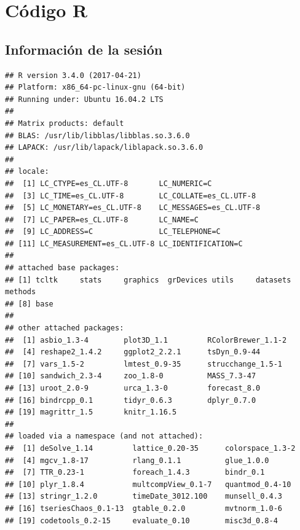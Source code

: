 \documentclass[12pt, twoside]{book}\usepackage[]{graphicx}\usepackage[]{color}
\makeatletter
\newenvironment{kframe}{%
 \def\at@end@of@kframe{}%
 \ifinner\ifhmode%
  \def\at@end@of@kframe{\end{minipage}}%
  \begin{minipage}{\columnwidth}%
 \fi\fi%
 \def\FrameCommand##1{\hskip\@totalleftmargin \hskip-\fboxsep
 \colorbox{shadecolor}{##1}\hskip-\fboxsep
     \hskip-\linewidth \hskip-\@totalleftmargin \hskip\columnwidth}%
 \MakeFramed {\advance\hsize-\width
   \@totalleftmargin\z@ \linewidth\hsize
   \@setminipage}}%
 {\par\unskip\endMakeFramed%
 \at@end@of@kframe}
\newenvironment{knitrout}{}{} %
\numberwithin{equation}{section}
\numberwithin{theorem}{section}
\numberwithin{teorema}{section}
\numberwithin{defi}{section}
\numberwithin{prop}{section}
\numberwithin{defi}{section}
\theoremstyle{plain}
\makeatother
\begin{document}
\endgroup
\begingroup
\renewcommand\thesection{B}
\titleformat{\section}[display]
{\normalfont\huge\bfseries}{}{20pt}{\huge}
\section{Código R}
\subsection{Información de la sesión}
\begin{knitrout}\scriptsize
{}\color{fgcolor}\begin{kframe}
\begin{verbatim}
## R version 3.4.0 (2017-04-21)
## Platform: x86_64-pc-linux-gnu (64-bit)
## Running under: Ubuntu 16.04.2 LTS
## 
## Matrix products: default
## BLAS: /usr/lib/libblas/libblas.so.3.6.0
## LAPACK: /usr/lib/lapack/liblapack.so.3.6.0
## 
## locale:
##  [1] LC_CTYPE=es_CL.UTF-8       LC_NUMERIC=C              
##  [3] LC_TIME=es_CL.UTF-8        LC_COLLATE=es_CL.UTF-8    
##  [5] LC_MONETARY=es_CL.UTF-8    LC_MESSAGES=es_CL.UTF-8   
##  [7] LC_PAPER=es_CL.UTF-8       LC_NAME=C                 
##  [9] LC_ADDRESS=C               LC_TELEPHONE=C            
## [11] LC_MEASUREMENT=es_CL.UTF-8 LC_IDENTIFICATION=C       
## 
## attached base packages:
## [1] tcltk     stats     graphics  grDevices utils     datasets  methods  
## [8] base     
## 
## other attached packages:
##  [1] asbio_1.3-4        plot3D_1.1         RColorBrewer_1.1-2
##  [4] reshape2_1.4.2     ggplot2_2.2.1      tsDyn_0.9-44      
##  [7] vars_1.5-2         lmtest_0.9-35      strucchange_1.5-1 
## [10] sandwich_2.3-4     zoo_1.8-0          MASS_7.3-47       
## [13] uroot_2.0-9        urca_1.3-0         forecast_8.0      
## [16] bindrcpp_0.1       tidyr_0.6.3        dplyr_0.7.0       
## [19] magrittr_1.5       knitr_1.16.5      
## 
## loaded via a namespace (and not attached):
##  [1] deSolve_1.14         lattice_0.20-35      colorspace_1.3-2    
##  [4] mgcv_1.8-17          rlang_0.1.1          glue_1.0.0          
##  [7] TTR_0.23-1           foreach_1.4.3        bindr_0.1           
## [10] plyr_1.8.4           multcompView_0.1-7   quantmod_0.4-10     
## [13] stringr_1.2.0        timeDate_3012.100    munsell_0.4.3       
## [16] tseriesChaos_0.1-13  gtable_0.2.0         mvtnorm_1.0-6       
## [19] codetools_0.2-15     evaluate_0.10        misc3d_0.8-4        

\end{verbatim}
\end{kframe}
\end{knitrout}
\end{document}
